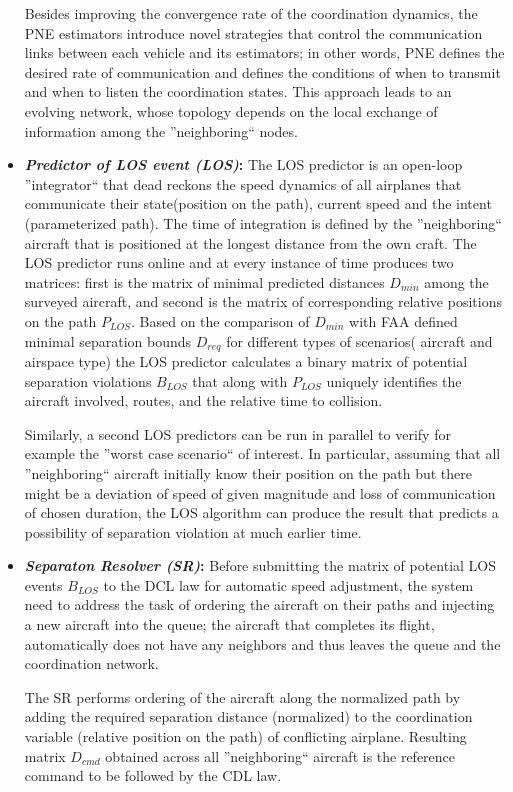 \documentclass[letter,onecolumn,12pt]{aiaa-tc}
\newcommand{\1}{1_n}
\begin{document}
\begin{itemize}
Besides improving  the convergence rate of the coordination dynamics, the PNE estimators introduce novel strategies that control the communication links between each vehicle and its estimators; in other words, PNE defines the desired rate of communication and defines the conditions of when to transmit and when to listen the coordination states. This approach leads to an evolving network, whose topology depends on the local exchange of information among the ''neighboring`` nodes.

\item \textbf{\emph{Predictor of LOS event (LOS)}:} The LOS predictor is an open-loop ''integrator`` that dead reckons the speed dynamics of all airplanes that communicate their state(position on the path), current speed and the intent (parameterized path). The time of integration is defined by the ''neighboring`` aircraft that is positioned at the longest distance from the own craft. The LOS predictor runs online and at every instance of time produces two matrices: first is the matrix of minimal predicted distances $D_{min}$ among the surveyed aircraft, and second is the matrix of corresponding relative positions on the path $P_{LOS}$. Based on the comparison of $D_{min}$ with FAA defined minimal separation bounds $D_{req}$ for different types of scenarios( aircraft and airspace type) the LOS predictor calculates a binary matrix of potential separation violations $B_{LOS}$ that along with $P_{LOS}$ uniquely identifies the aircraft involved, routes, and the relative time to collision.

Similarly, a second LOS predictors can be run in parallel to verify for example the ''worst case scenario`` of interest. In particular, assuming that all ''neighboring`` aircraft initially know their  position on the path but there might be a deviation of speed of given magnitude and loss of communication of chosen duration, the LOS algorithm can produce the result that predicts a possibility of separation violation at much earlier time.

\item \textbf{\emph{Separaton Resolver (SR)}:} Before submitting the matrix of potential LOS events $B_{LOS}$ to the DCL law for automatic speed adjustment, the system need to address the task of ordering the aircraft on their paths and injecting a new aircraft into the queue; the aircraft that completes its flight, automatically does not have any neighbors and thus leaves the queue and the coordination network.

The SR performs ordering of the aircraft along the normalized path by adding the required separation distance (normalized) to the coordination variable (relative position on the path) of conflicting airplane. Resulting matrix $D_{cmd}$ obtained across all ''neighboring`` aircraft is the reference command to be followed by the CDL law.


\end{itemize}
\end{document}
